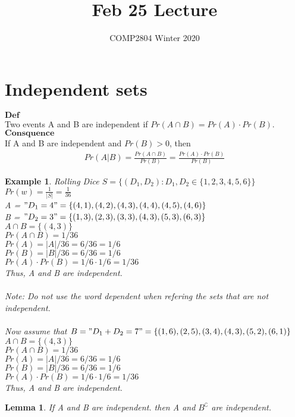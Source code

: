 \documentclass[a4paper,12pt]{article}
\title{Feb 25 Lecture}
\author{COMP2804 Winter 2020}
\newtheorem{example}{Example}
\newtheorem{lemma}{Lemma}
\begin{document}
\section{Independent sets}
$\textbf{Def}$\\
    Two events A and B are independent if $Pr(A \cap B) = Pr(A) \cdot Pr(B)$.
$\textbf{Consquence}$\\
    If A and B are independent and $Pr(B) > 0$, then
\begin{align*}
    Pr(A | B) = \frac{Pr(A \cap B)}{Pr(B)} = \frac{Pr(A)\cdot Pr(B)}{Pr(B)}
\end{align*}
\begin{example}
    Rolling Dice $S = \{(D_{1}, D_{2}) : D_{1}, D_{2} \in \{1,2,3,4,5,6\}\}$\\
    $Pr(w) = \frac{1}{|S|} = \frac{1}{36}$\\ 
    A = $"D_{1} = 4" = \{(4,1),(4,2),(4,3),(4,4),(4,5),(4,6)\}$\\ 
    B = $"D_{2} = 3" = \{(1,3),(2,3),(3,3),(4,3),(5,3),(6,3)\}$\\ 
    $A \cap B = \{(4,3)\}$\\
    $Pr(A\cap B) = 1/36$\\
    $Pr(A) = |A|/36 = 6/36 = 1/6$\\
    $Pr(B) = |B|/36 = 6/36 = 1/6$\\
    $Pr(A) \cdot Pr(B) = 1/6 \cdot 1/6 = 1/36$\\
    Thus, A and B are independent.
\\\\
    Note: Do not use the word dependent when refering the sets that are not independent.
\\\\
    Now assume that $B = "D_{1} + D_{2} = 7" = \{(1,6),(2,5),(3,4),(4,3),(5,2),(6,1)\}$\\
    $A \cap B = \{(4,3)\}$\\
    $Pr(A\cap B) = 1/36$\\
    $Pr(A) = |A|/36 = 6/36 = 1/6$\\
    $Pr(B) = |B|/36 = 6/36 = 1/6$\\
    $Pr(A) \cdot Pr(B) = 1/6 \cdot 1/6 = 1/36$\\
    Thus, A and B are independent.\\
\end{example}
\begin{lemma}
    If A and B are independent. then A and $B^{\complement}$ are independent.
\end{lemma}
\end{document}
